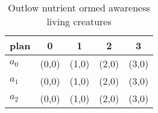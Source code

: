\documentclass[a4paper]{article}
\begin{document}
\begin{table}
\begin{adjustbox}{width=0.5\columnwidth}
\begin{tabular}{|l|l|l|l|l|}
\hline
\textbf{plan} & \multicolumn{1}{c|}{\textbf{0}} & \multicolumn{1}{c|}{\textbf{1}} & \multicolumn{1}{c|}{\textbf{2}} & \multicolumn{1}{c|}{\textbf{3}} \\ \hline
\textbf{$a_0$}  & (0,0) & (1,0) & (2,0) & (3,0) \\ \hline
\textbf{$a_1$}  & (0,0) & (1,0) & (2,0) & (3,0) \\ \hline
\textbf{$a_2$}  & (0,0) & (1,0) & (2,0) & (3,0) \\ \hline
\end{tabular}
\end{adjustbox}
\caption{Outlow nutrient ormed awareness living creatures 
}
\end{table}
\end{document}
